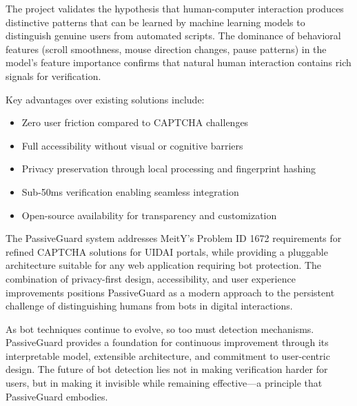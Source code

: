 The project validates the hypothesis that human-computer interaction produces distinctive patterns that can be learned by machine learning models to distinguish genuine users from automated scripts. The dominance of behavioral features (scroll smoothness, mouse direction changes, pause patterns) in the model's feature importance confirms that natural human interaction contains rich signals for verification.

Key advantages over existing solutions include:
\begin{itemize}
    \item Zero user friction compared to CAPTCHA challenges
    \item Full accessibility without visual or cognitive barriers
    \item Privacy preservation through local processing and fingerprint hashing
    \item Sub-50ms verification enabling seamless integration
    \item Open-source availability for transparency and customization
\end{itemize}

The PassiveGuard system addresses MeitY's Problem ID 1672 requirements for refined CAPTCHA solutions for UIDAI portals, while providing a pluggable architecture suitable for any web application requiring bot protection. The combination of privacy-first design, accessibility, and user experience improvements positions PassiveGuard as a modern approach to the persistent challenge of distinguishing humans from bots in digital interactions.

As bot techniques continue to evolve, so too must detection mechanisms. PassiveGuard provides a foundation for continuous improvement through its interpretable model, extensible architecture, and commitment to user-centric design. The future of bot detection lies not in making verification harder for users, but in making it invisible while remaining effective---a principle that PassiveGuard embodies.

